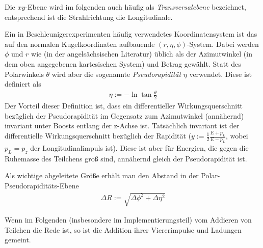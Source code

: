 Die $xy$-Ebene wird im folgenden auch häufig als \emph{Transversalebene}
bezeichnet, entsprechend ist die Strahlrichtung die Longitudinale.

Ein in Beschleunigerexperimenten häufig verwendetes Koordinatensystem ist das
auf den normalen Kugelkoordinaten aufbauende $(r, \eta, \phi)$-System.  Dabei
werden $\phi$ und $r$ wie (in der angelsächsischen Literatur) üblich als der
Azimutwinkel (in dem oben angegebenen kartesischen System) und Betrag gewählt.
Statt des Polarwinkels $\theta$ wird aber die sogenannte \emph{Pseudorapidität}
$\eta$ verwendet. Diese ist definiert als
\begin{align}
  \eta := -\ln{\tan{\frac \theta 2}}
\end{align}
Der Vorteil dieser Definition ist, dass ein differentieller Wirkungsquerschnitt
bezüglich der Pseudorapidität im Gegensatz zum Azimutwinkel (annähernd)
invariant unter Boosts entlang der z-Achse ist.  Tatsächlich invariant ist der
differentielle Wirkungsquerschnitt bezüglich der Rapidität ($y := \frac12
\frac{E + p_L}{E - p_L}$, wobei $p_L = p_z$ der Longitudinalimpuls ist). Diese
ist aber für Energien, die gegen die Ruhemasse des Teilchens groß sind,
annähernd gleich der Pseudorapidität ist.

Als wichtige abgeleitete Größe erhält man den Abstand in der
Polar-Pseudorapiditäts-Ebene
\begin{align}
  \Delta R := \sqrt{\Delta\phi^2 + \Delta\eta^2}
  \label{def:dr}
\end{align}

Wenn im Folgenden (insbesondere im Implementierungsteil) vom Addieren von
Teilchen die Rede ist, so ist die Addition ihrer Viererimpulse und Ladungen
gemeint.

